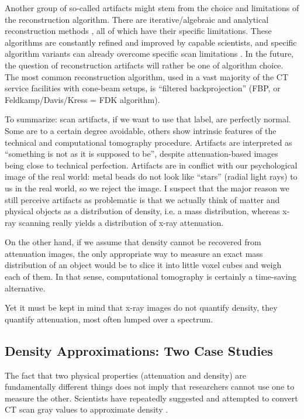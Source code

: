 Another group of so-called artifacts might stem from the choice and limitations of the reconstruction algorithm.
There are iterative/algebraic and analytical reconstruction methods \citep{Gilbert1972,Andersen1984,Feldkamp1984,Geyer2015,Hansen2021}, all of which have their specific limitations.
These algorithms are constantly refined and improved by capable scientists, and specific algorithm variants can already overcome specific scan limitations \citep[e.g.][]{Six2019,Frenkel2022}.
In the future, the question of reconstruction artifacts will rather be one of algorithm choice.
The most common reconstruction algorithm, used in a vast majority of the CT service facilities with cone-beam setups, is ``filtered backprojection'' (FBP, or Feldkamp/Davis/Kress = FDK algorithm).


To summarize: scan artifacts, if we want to use that label, are perfectly normal.
Some are to a certain degree avoidable, others show intrinsic features of the technical and computational tomography procedure.
Artifacts are interpreted as ``something is not as it is supposed to be'', despite attenuation-based images being close to technical perfection.
Artifacts are in conflict with our psychological image of the real world: metal beads do not look like ``stars'' (radial light rays) to us in the real world, so we reject the image.
I suspect that the major reason we still perceive artifacts as problematic is that we actually think of matter and physical objects as a distribution of density, i.e. a mass distribution, whereas x-ray scanning really yields a distribution of x-ray attenuation.

On the other hand, if we assume that density cannot be recovered from attenuation images, the only appropriate way to measure an exact mass distribution of an object would be to slice it into little voxel cubes and weigh each of them.
In that sense, computational tomography is certainly a time-saving alternative.


Yet it must be kept in mind that x-ray images do not quantify density, they quantify attenuation, most often lumped over a spectrum.


\subsection{Density Approximations: Two Case Studies}
\label{sec:orgf339bf1}
The fact that two physical properties (attenuation and density) are fundamentally different things does not imply that researchers cannot use one to measure the other.
Scientists have repeatedly suggested and attempted to convert CT scan gray values to approximate density \citep{DuPlessis2013,Durston2022}.



